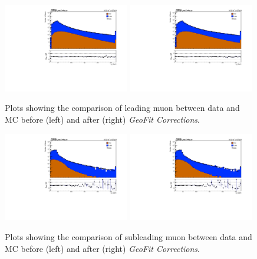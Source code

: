 \begin{figure}[h!]
    \centering
    \includegraphics[width=0.49\textwidth]{images_geofit/pt_comp_data_MC_leading_before.pdf}
    \includegraphics[width=0.49\textwidth]{images_geofit/pt_comp_data_MC_leading_after.pdf}
    \caption{Plots showing the comparison of leading muon \pt between data and MC before (left) and after (right) \textit{GeoFit Corrections}.}
    \label{fig:pt_comp_data_MC_leading}
\end{figure}

\begin{figure}[h!]
    \centering
    \includegraphics[width=0.49\textwidth]{images_geofit/pt_comp_data_MC_subleading_before.pdf}
    \includegraphics[width=0.49\textwidth]{images_geofit/pt_comp_data_MC_subleading_after.pdf}
    \caption{Plots showing the comparison of subleading muon \pt between data and MC before (left) and after (right) \textit{GeoFit Corrections}.}
    \label{fig:pt_comp_data_MC_subleading}
\end{figure}

